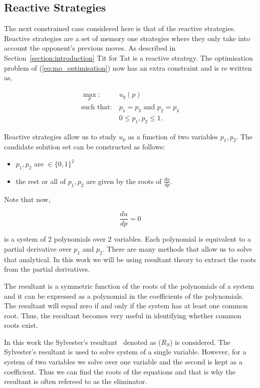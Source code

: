 \documentclass[10pt]{article}
\begin{document}
\subsection{Reactive Strategies}\label{section:reactive_analytical}

The next constrained case considered here is that of the reactive strategies.
Reactive strategies are a set of memory one strategies where they only take into
account the opponent's previous moves. As described in Section~\ref{section:introduction}
Tit for Tat is a reactive strategy. The optimisation problem of (\ref{eq:mo_optimisation})
now has an extra constraint and is re written as,

\begin{equation}\label{eq:random_optimisation}
\begin{aligned}
\max_p: & \ u_q(p)
\\
\text{such that}: & \ p_1 = p_3 \text{ and } p_2 = p_4\\
    & \ 0 \leq p_1, p_2 \leq 1.
\end{aligned}
\end{equation}

Reactive strategies allow us to study \(u_p\) as a function of two variables
\(p_1, p_2\). The candidate solution set can be constructed as follows:

\begin{itemize}
    \item \(p_1, p_2\) are \(\in \{0, 1\} ^ 2\)
    \item the rest or all of \(p_1, p_2\) are given by the roots of \(\frac{du}{dp}\).
\end{itemize}

Note that now,

\[\frac{du}{dp} = 0 \]

is a system of 2 polynomials over 2 variables. Each polynomial is equivalent
to a partial derivative over \(p_1\) and \(p_2\). There are many methods that allow
us to solve that analytical. In this work we will be using resultant theory to
extract the roots from the partial derivatives.

The resultant is a symmetric function of the roots of the polynomials of a system
and it can be expressed as a polynomial in the coefficients of the polynomials.
The resultant will equal zero if and only if the system has at least one common
root. Thus, the resultant becomes very useful in identifying whether common roots exist.

In this work the Sylvester's resultant~\cite{Akritas1991} denoted as (\(R_S\))
is considered. The Sylvester's resultant is used to solve system of a single
variable. However, for a system of two variables we solve over one variable and
the second is kept as a coefficient. Thus we can find the roots of the equations
and that is why the resultant is often refereed to as the eliminator.
\end{document}
